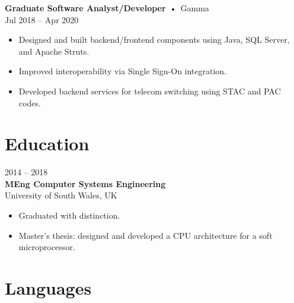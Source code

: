 \documentclass[11pt,a4paper]{moderncv}
\begin{document}
\begin{minipage}[c]{0.08\textwidth}
  \raggedleft
\end{minipage}%
\hspace{0.5em}%
\begin{minipage}[t]{0.9\textwidth}
  \textbf{Graduate Software Analyst/Developer} \,•\, {\color{mydarkblue}Gamma}\\
  {\footnotesize Jul 2018 -- Apr 2020}
  \begin{itemize}
    \item Designed and built backend/frontend components using Java, SQL Server, and Apache Struts.
    \item Improved interoperability via Single Sign-On integration.
    \item Developed backend services for telecom switching using STAC and PAC codes.
  \end{itemize}
\end{minipage}
\vspace{0.5em}

\begin{minipage}[t]{0.6\textwidth}
  \section{Education}
  \begin{minipage}[t]{0.13\textwidth}
    \raggedleft
  \end{minipage}%
  \hspace{0.3em}%
  \begin{minipage}[t]{0.9\textwidth}
    2014 -- 2018\\
    \textbf{MEng Computer Systems Engineering}\\
    University of South Wales, UK\\[-0.5em]
    \begin{itemize}
      \item Graduated with distinction.
      \item Master's thesis: designed and developed a CPU architecture for a soft microprocessor.
    \end{itemize}
  \end{minipage}
\end{minipage}%
\hfill
\begin{minipage}[t]{0.4\textwidth}
  \section{Languages}
\end{minipage}
\end{document}
